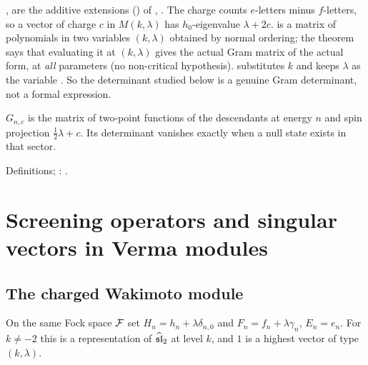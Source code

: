 \begin{dictionary}
,  are the additive extensions () of
, . The charge counts $e$-letters minus $f$-letters, so a
vector of charge $c$ in $M(k,\lambda)$ has $h_0$-eigenvalue $\lambda+2c$.  is a
matrix of polynomials in two variables $(k,\lambda)$ obtained by normal ordering; the theorem
\allowbreak{} says that evaluating it at $(k,\lambda)$ gives the actual Gram matrix of
the actual form, at \emph{all} parameters (no non-critical hypothesis). 
substitutes $k$ and keeps $\lambda$ as the variable . So the determinant studied below is a genuine
Gram determinant, not a formal expression.
\end{dictionary}

\begin{physics}
$G_{n,c}$ is the matrix of two-point functions of the descendants at energy $n$ and spin projection
$\frac12\lambda+c$. Its determinant vanishes exactly when a null state exists in that sector.
\end{physics}

\begin{status}
Definitions; \allowbreak{}: \lean{[propext, Classical.}\allowbreak{}\allowbreak\lean{sound]}.
\end{status}

\section{Screening operators and singular vectors in Verma modules}\label{l08:sec:screening}

\subsection{The charged Wakimoto module}

\begin{definition}\label{l08:def:charged}
On the same Fock space $\mathcal{F}$ set $H_n = h_n + \lambda\delta_{n,0}$ and $F_n = f_n + \lambda\gamma_n$, $E_n = e_n$.
For $k\ne-2$ this is a representation of $\widehat{\mathfrak{sl}}_2$ at level $k$, and $1$ is a highest vector of type
$(k,\lambda)$.
\end{definition}

